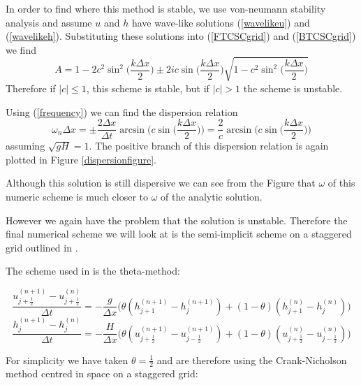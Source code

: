 \documentclass[a4paper,12pt, notitlepage]{report}
\begin{document}
In order to find where this method is stable, we use von-neumann stability analysis and assume $u$ and $h$ have wave-like solutions (\ref{wavelikeu}) and (\ref{wavelikeh}). Substituting these solutions into (\ref{FTCSCgrid}) and (\ref{BTCSCgrid}) we find
\begin{equation}
A = 1 - 2c^{2}\sin^{2}\bigg(\frac{k\Delta x}{2}\bigg) \pm 2ic\sin\bigg(\frac{k\Delta x}{2}\bigg) \sqrt{1 - c^{2}\sin^{2}(\frac{k\Delta x}{2}\bigg)}
\end{equation}
Therefore if $\lvert c \rvert \leq 1$, this scheme is stable, but if $\lvert c \rvert > 1$ the scheme is unstable.

Using (\ref{frequency}) we can find the dispersion relation
\begin{equation}
	\omega_{n} \Delta x = \pm\frac{2\Delta x}{\Delta t} \arcsin\bigg(c\sin\bigg(\frac{k\Delta x}{2}\bigg)\bigg) = \frac{2}{c} \arcsin\bigg(c\sin\bigg(\frac{k\Delta x}{2}\bigg)\bigg) 
\end{equation}
assuming $\sqrt{gH} = 1$. The positive branch of this dispersion relation is again plotted in Figure \ref{dispersionfigure}. 

Although this solution is still dispersive we can see from the Figure that $\omega$ of this numeric scheme is much closer to $\omega$ of the analytic solution.

However we again have the problem that the solution is unstable. Therefore the final numerical scheme we will look at is the semi-implicit scheme on a staggered grid outlined in \cite{semi-implicit}.

The scheme used in \cite{semi-implicit} is the theta-method:

\begin{equation}
\frac{u_{j + \frac{1}{2}}^{(n + 1)} - u_{j + \frac{1}{2}}^{(n)}}{\Delta t} = -\frac{g}{\Delta x} \bigg(\theta (h_{j + 1}^{(n+ 1)} - h_{j}^{(n+ 1)}) + (1 - \theta) (h_{j + 1}^{(n)} - h_{j}^{(n)})\bigg)
\end{equation}
\begin{equation}
\frac{h_{j}^{(n + 1)} - h_{j}^{(n)}}{\Delta t} = -\frac{H}{\Delta x} \bigg(\theta (u_{j + \frac{1}{2}}^{(n+ 1)} - u_{j - \frac{1}{2}}^{(n+ 1)}) + (1 - \theta) (u_{j + \frac{1}{2}}^{(n)} - u_{j - \frac{1}{2}}^{(n)})\bigg)
\end{equation}

For simplicity we have taken $\theta = \frac{1}{2}$ and are therefore using the Crank-Nicholson method centred in space on a staggered grid:
\end{document}
